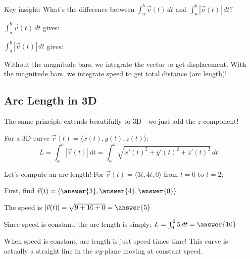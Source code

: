\documentclass{ximera}
\begin{document}
\begin{problem}
Key insight: What's the difference between $\int_a^b \vec{v}(t) \, dt$ and $\int_a^b |\vec{v}(t)| \, dt$?

$\int_a^b \vec{v}(t) \, dt$ gives:
\begin{multipleChoice}
\end{multipleChoice}

$\int_a^b |\vec{v}(t)| \, dt$ gives:
\begin{multipleChoice}
\end{multipleChoice}

\begin{feedback}
Without the magnitude bars, we integrate the vector to get displacement. With the magnitude bars, we integrate speed to get total distance (arc length)!
\end{feedback}
\end{problem}

\subsection*{Arc Length in 3D}

The same principle extends beautifully to 3D—we just add the $z$-component!

\begin{definition}
For a 3D curve $\vec{r}(t) = \langle x(t), y(t), z(t) \rangle$:
$$L = \int_a^b |\vec{v}(t)| \, dt = \int_a^b \sqrt{x'(t)^2+y'(t)^2+z'(t)^2} \, dt$$
\end{definition}

\begin{problem}
Let's compute an arc length! For $\vec{r}(t) = \langle 3t, 4t, 0 \rangle$ from $t=0$ to $t=2$:

First, find $\vec{v}(t) = \langle \answer{3}, \answer{4}, \answer{0} \rangle$

The speed is $|\vec{v}(t)| = \sqrt{9 + 16 + 0} = \answer{5}$

Since speed is constant, the arc length is simply:
$L = \int_0^2 5 \, dt = \answer{10}$

\begin{feedback}
When speed is constant, arc length is just speed times time! This curve is actually a straight line in the $xy$-plane moving at constant speed.
\end{feedback}
\end{problem}
\end{document}
